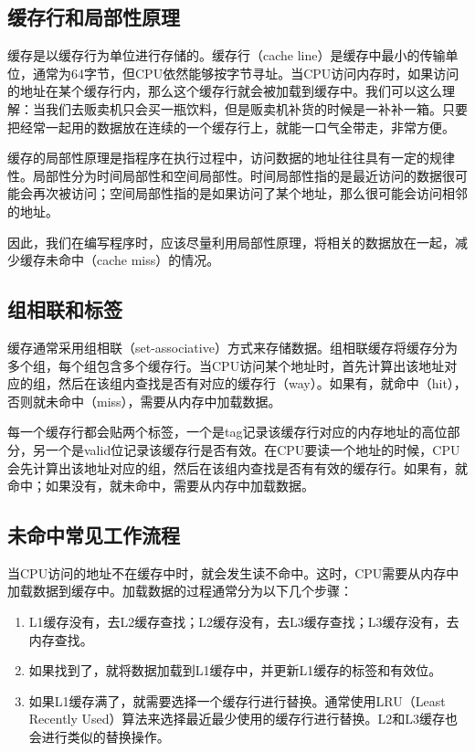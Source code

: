\documentclass[../main.tex]{subfiles}
\begin{document}
\subsection{缓存行和局部性原理}

缓存是以缓存行为单位进行存储的。缓存行（cache line）是缓存中最小的传输单位，通常为64字节，但CPU依然能够按字节寻址。当CPU访问内存时，如果访问的地址在某个缓存行内，那么这个缓存行就会被加载到缓存中。我们可以这么理解：当我们去贩卖机只会买一瓶饮料，但是贩卖机补货的时候是一补补一箱。只要把经常一起用的数据放在连续的一个缓存行上，就能一口气全带走，非常方便。

缓存的局部性原理是指程序在执行过程中，访问数据的地址往往具有一定的规律性。局部性分为时间局部性和空间局部性。时间局部性指的是最近访问的数据很可能会再次被访问；空间局部性指的是如果访问了某个地址，那么很可能会访问相邻的地址。

因此，我们在编写程序时，应该尽量利用局部性原理，将相关的数据放在一起，减少缓存未命中（cache miss）的情况。

\subsection{组相联和标签}

缓存通常采用组相联（set-associative）方式来存储数据。组相联缓存将缓存分为多个组，每个组包含多个缓存行。当CPU访问某个地址时，首先计算出该地址对应的组，然后在该组内查找是否有对应的缓存行（way）。如果有，就命中（hit），否则就未命中（miss），需要从内存中加载数据。

每一个缓存行都会贴两个标签，一个是tag记录该缓存行对应的内存地址的高位部分，另一个是valid位记录该缓存行是否有效。在CPU要读一个地址的时候，CPU会先计算出该地址对应的组，然后在该组内查找是否有有效的缓存行。如果有，就命中；如果没有，就未命中，需要从内存中加载数据。

\subsection{未命中常见工作流程}

当CPU访问的地址不在缓存中时，就会发生读不命中。这时，CPU需要从内存中加载数据到缓存中。加载数据的过程通常分为以下几个步骤：
\begin{enumerate}
  \item L1缓存没有，去L2缓存查找；L2缓存没有，去L3缓存查找；L3缓存没有，去内存查找。
  \item 如果找到了，就将数据加载到L1缓存中，并更新L1缓存的标签和有效位。
  \item 如果L1缓存满了，就需要选择一个缓存行进行替换。通常使用LRU（Least Recently Used）算法来选择最近最少使用的缓存行进行替换。L2和L3缓存也会进行类似的替换操作。
\end{enumerate}
\end{document}
